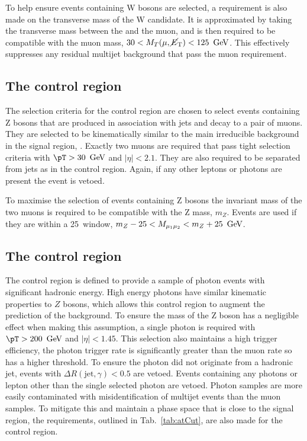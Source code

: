 To help ensure events containing W bosons are selected, a requirement
is also made on the transverse mass of the W candidate. It is
approximated by taking the transverse mass between the \MET and the
muon, and is then required to be compatible with the muon mass,
$30<M_T(\mu,\mbox{$\cancel{E}_\text{T}$})<125~\mathrm{\,Ge\kern -0.1em V}$. This effectively suppresses any residual
\QCD multijet background that pass the muon requirement.

\subsection{The \mmj control region}

The selection criteria for the \mmj control region are chosen to
select events containing Z bosons that are produced in association
with jets and decay to a pair of muons. They are selected to be
kinematically similar to the main irreducible background in the signal
region, \znunu. Exactly two muons are required that
pass tight selection criteria with $\pT>30~\gev$ and $|\eta|<2.1$.
They are also required to be separated from jets as in the \mj control
region. Again, if any other leptons or photons are present the event
is vetoed.

To maximise the selection of events containing Z bosons the
invariant mass of the two muons is required to be compatible with the
Z mass, $m_Z$. Events are used if they are within a 25~\gev window,
$m_Z-25<M_{\mu_1\mu_2}<m_Z+25~\mathrm{\,Ge\kern -0.1em V}$.

\subsection{The \gj control region}

The \gj control region is defined to provide a sample of photon events
with significant hadronic energy. High energy photons have similar
kinematic properties to $Z$ bosons, which allows this control region
to augment the prediction of the \znunu background. To
ensure the mass of the Z boson has a negligible effect when making
this assumption, a single photon is required with $\pT>200~\gev$ and
$|\eta|<1.45$. This selection also maintains a high trigger
efficiency, the photon trigger rate is significantly greater than the
muon rate so has a higher \pT threshold. To ensure the photon did not
originate from a hadronic jet, events with $\Delta
R(\mathrm{jet},\gamma)<0.5$ are vetoed. Events containing any photons
or lepton other than the single selected photon are vetoed. Photon
samples are more easily contaminated with misidentification of \QCD
multijet events than the muon samples. To mitigate this and maintain a
phase space that is close to the signal region, the \alphat
requirements, outlined in Tab.~\ref{tab:atCut}, are also made for the \gj
control region.

